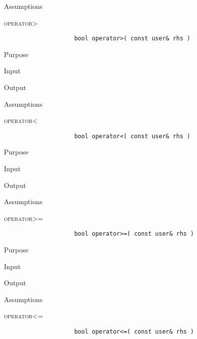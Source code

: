 \documentclass[pdftex, 12pt]{article}
\begin{document}
\begin{description}
\begin{description}
\begin{description}
\begin{description}
					\item{Assumptions}

				\end{description}

			\item{\textsc{operator>}}
				\begin{lstlisting}
					bool operator>( const user& rhs )
				\end{lstlisting}
				\begin{description}

					\item{Purpose}

					\item{Input}

					\item{Output}

					\item{Assumptions}

				\end{description}
			\item{\textsc{operator<}}
				\begin{lstlisting}
					bool operator<( const user& rhs )
				\end{lstlisting}
				\begin{description}

					\item{Purpose}

					\item{Input}

					\item{Output}

					\item{Assumptions}

				\end{description}
			\item{\textsc{operator>=}}
				\begin{lstlisting}
					bool operator>=( const user& rhs )
				\end{lstlisting}
				\begin{description}

					\item{Purpose}

					\item{Input}

					\item{Output}

					\item{Assumptions}

				\end{description}
			\item{\textsc{operator<=}}
				\begin{lstlisting}
					bool operator<=( const user& rhs )
				\end{lstlisting}
				\begin{description}


\end{description}
\end{description}
\end{description}
\end{description}
\end{document}
